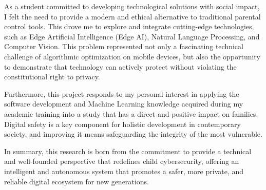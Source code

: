 {    As a student committed to developing technological solutions with social impact, I felt the need to provide a modern and ethical alternative to traditional parental control tools. This drove me to explore and integrate cutting-edge technologies, such as Edge Artificial Intelligence (Edge AI), Natural Language Processing, and Computer Vision. This problem represented not only a fascinating technical challenge of algorithmic optimization on mobile devices, but also the opportunity to demonstrate that technology can actively protect without violating the constitutional right to privacy.

    Furthermore, this project responds to my personal interest in applying the software development and Machine Learning knowledge acquired during my academic training into a study that has a direct and positive impact on families. Digital safety is a key component for holistic development in contemporary society, and improving it means safeguarding the integrity of the most vulnerable.

    In summary, this research is born from the commitment to provide a technical and well-founded perspective that redefines child cybersecurity, offering an intelligent and autonomous system that promotes a safer, more private, and reliable digital ecosystem for new generations.
}

\MediaOptionLogicBlank